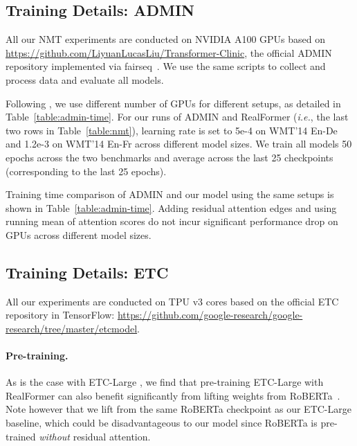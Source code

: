 \documentclass[11pt,a4paper]{article}
\begin{document}
\subsection{Training Details: ADMIN}  \label{sec:appendix:admin}
All our NMT experiments are conducted on NVIDIA A100 GPUs based on \url{https://github.com/LiyuanLucasLiu/Transformer-Clinic}, the official ADMIN repository implemented via fairseq~\citep{Ott-2019-fairseq}.
We use the same scripts to collect and process data and evaluate all models.

Following \citet{Liu-2020-admin}, we use different number of GPUs for different setups, as detailed in Table~\ref{table:admin-time}.
For our runs of ADMIN and RealFormer (\emph{i.e.}, the last two rows in Table~\ref{table:nmt}), learning rate is set to 5e-4 on WMT'14 En-De and 1.2e-3 on WMT'14 En-Fr across different model sizes.
We train all models 50 epochs across the two benchmarks and average across the last 25 checkpoints (corresponding to the last 25 epochs).

Training time comparison of ADMIN and our model using the same setups is shown in Table~\ref{table:admin-time}. 
Adding residual attention edges and using running mean of attention scores do not incur significant performance drop on GPUs across different model sizes.




\subsection{Training Details: ETC}
All our experiments are conducted on TPU v3 cores based on the official ETC repository in TensorFlow: \url{https://github.com/google-research/google-research/tree/master/etcmodel}.

\paragraph{Pre-training.} 
As is the case with ETC-Large \citep{Ainslie-2020-etc}, we find that pre-training ETC-Large with RealFormer can also benefit significantly from lifting weights from RoBERTa~\citep{Liu-2019-roberta}.
Note however that we lift from the same RoBERTa checkpoint as our ETC-Large baseline, which could be disadvantageous to our model since RoBERTa is pre-trained \emph{without} residual attention.
\end{document}
